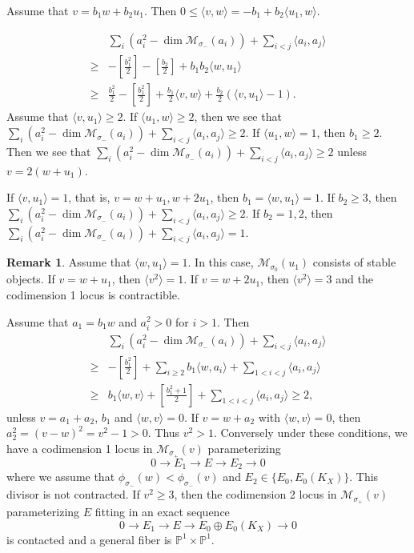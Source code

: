 \documentclass[leqno,11pt]{amsart}
\def\P{\ensuremath{\mathbb{P}}}
\def\dim{\mathop{\mathrm{dim}}\nolimits}
\theoremstyle{definition}
\newtheorem{Rem}[Thm]{Remark}
\def\P{\ensuremath{\mathbb{P}}}
\def\MM{\ensuremath{\mathcal M}}
\begin{document}
Assume that 
$v=b_1 w+b_2 u_1$.
Then $0 \leq \langle v,w \rangle=-b_1+b_2 \langle u_1,w \rangle$.

 \begin{equation}
\begin{split}
& \sum_i (a_i^2-\dim \MM_{\sigma_-}(a_i))+\sum_{i<j}\langle a_i,a_j \rangle\\
\geq & -[\tfrac{b_1^2}{2}]-[\tfrac{b_2}{2}]+b_1 b_2 \langle w,u_1 \rangle\\
\geq & \frac{b_1^2}{2} -[\tfrac{b_1^2}{2}]+
\frac{b_1}{2}\langle v,w \rangle+\frac{b_2}{2}
(\langle v,u_1 \rangle-1).
\end{split}
\end{equation}
Assume that $\langle v,u_1 \rangle \geq 2$.
If $\langle u_1,w \rangle \geq 2$, 
then we see that
$\sum_i (a_i^2-\dim \MM_{\sigma_-}(a_i))+
\sum_{i<j}\langle a_i,a_j \rangle \geq 2$.
If $\langle u_1,w \rangle =1$, then
$b_1 \geq 2$.
Then we see that
$\sum_i (a_i^2-\dim \MM_{\sigma_-}(a_i))+
\sum_{i<j}\langle a_i,a_j \rangle \geq 2$
unless $v=2(w+u_1)$.

If $\langle v,u_1 \rangle =1$, that is,
$v=w+u_1,w+2u_1$,  then
$b_1=\langle w,u_1 \rangle=1$.
If $b_2 \geq 3$, then
$\sum_i (a_i^2-\dim \MM_{\sigma_-}(a_i))+
\sum_{i<j}\langle a_i,a_j \rangle \geq 2$.
If $b_2=1,2$, then
$\sum_i (a_i^2-\dim \MM_{\sigma_-}(a_i))+
\sum_{i<j}\langle a_i,a_j \rangle =1$.

\begin{Rem}
Assume that $\langle w,u_1 \rangle=1$.
In this case, $\MM_{\sigma_0}(u_1)$
consists of stable objects.
If $v=w+u_1$, then $\langle v^2 \rangle=1$.
If $v=w+2 u_1$, then $\langle v^2 \rangle=3$ and
the codimension 1 locus is contractible.
\end{Rem}


Assume that $a_1=b_1 w$ and $a_i^2>0$ for $i>1$.
Then
 \begin{equation}
\begin{split}
& \sum_i (a_i^2-\dim \MM_{\sigma_-}(a_i))+\sum_{i<j}\langle a_i,a_j \rangle\\
\geq & -[\tfrac{b_1^2}{2}]+\sum_{i \geq 2}b_1 \langle w,a_i \rangle 
+\sum_{1<i<j}\langle a_i,a_j \rangle\\
\geq & b_1 \langle w,v \rangle+[\tfrac{b_1^2+1}{2}] 
+\sum_{1<i<j}\langle a_i,a_j \rangle\geq 2,
\end{split}
\end{equation}
unless $v=a_1+a_2$, 
$b_1$ and $\langle w,v \rangle=0$.
If $v=w+a_2$ with $\langle w,v \rangle=0$,
then $a_2^2=(v-w)^2=v^2-1>0$. Thus $v^2>1$.
Conversely under these conditions,
we have a codimension 1 locus in $\MM_{\sigma_+}(v)$
parameterizing
\begin{equation}
0 \to E_1 \to E \to E_2 \to 0
\end{equation}
where we assume that $\phi_{\sigma_-}(w)<\phi_{\sigma_-}(v)$ and
$E_2 \in \{E_0,E_0(K_X)\}$.
This divisor is not contracted.
If $v^2 \geq 3$, then
the codimension 2 locus
in 
$\MM_{\sigma_+}(v)$
parameterizing $E$ fitting in an exact sequence 
\begin{equation}
0 \to E_1 \to E \to E_0 \oplus E_0(K_X) \to 0
\end{equation}
is contacted and a general fiber is $\P^1 \times \P^1$.
\end{document}
